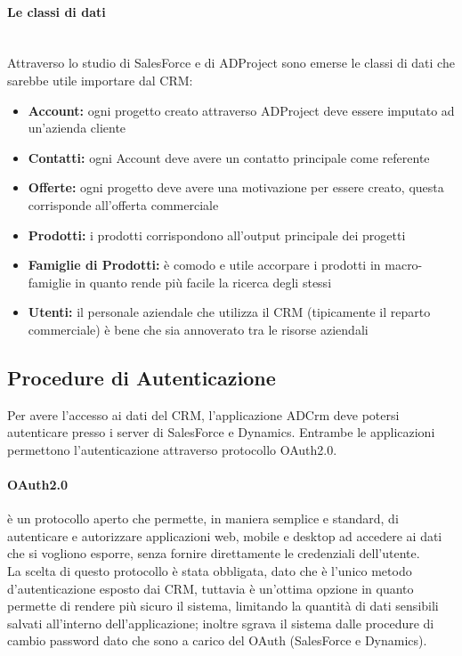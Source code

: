 \documentclass[12pt,a4paper,twoside,openany,english]{book}
\begin{document}
		\paragraph{Le classi di dati}~\\
			Attraverso lo studio di SalesForce e di ADProject sono emerse le classi di dati che sarebbe utile importare dal \gls{CRM}:
			\begin{itemize}
				\item \textbf{Account:} ogni progetto creato attraverso ADProject deve essere imputato ad un'azienda cliente
				\item \textbf{Contatti:} ogni Account deve avere un contatto principale come referente
				\item \textbf{Offerte:} ogni progetto deve avere una motivazione per essere creato, questa corrisponde all'offerta commerciale
				\item \textbf{Prodotti:} i prodotti corrispondono all'output principale dei progetti
				\item \textbf{Famiglie di Prodotti:} è comodo e utile accorpare i prodotti in macro-famiglie in quanto rende più facile la ricerca degli stessi 
				\item \textbf{Utenti:} il personale aziendale che utilizza il \gls{CRM} (tipicamente il reparto commerciale) è bene che sia annoverato tra le risorse aziendali
			\end{itemize}
		\par
		\subsection{Procedure di Autenticazione}
			Per avere l'accesso ai dati del \gls{CRM}, l'applicazione ADCrm deve potersi autenticare presso i server di SalesForce e Dynamics. Entrambe le applicazioni permettono l'autenticazione attraverso protocollo OAuth2.0.
			\paragraph{OAuth2.0}
			è un protocollo aperto che permette, in maniera semplice e standard, di autenticare e autorizzare applicazioni web, mobile e desktop ad accedere ai dati che si vogliono esporre, senza fornire direttamente le credenziali dell'utente.\\
			La scelta di questo protocollo è stata obbligata, dato che è l'unico metodo d'autenticazione esposto dai \gls{CRM}, tuttavia è un'ottima opzione in quanto permette di rendere più sicuro il sistema, limitando la quantità di dati sensibili salvati all'interno dell'applicazione; inoltre sgrava il sistema dalle procedure di cambio password dato che sono a carico del  OAuth (SalesForce e Dynamics).
\end{document}
